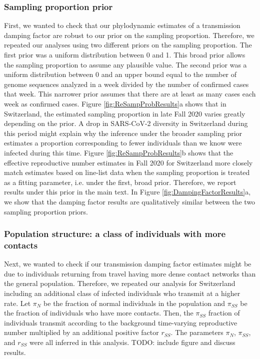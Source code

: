 \documentclass[9pt,twoside,lineno]{pnas-new}
\begin{document}
\subsubsection{Sampling proportion prior}
First, we wanted to check that our phylodynamic estimates of a transmission damping factor are robust to our prior on the sampling proportion. Therefore, we repeated our analyses using two different priors on the sampling proportion. The first prior was a uniform distribution between 0 and 1. This broad prior allows the sampling proportion to assume any plausible value. The second prior was a uniform distribution between 0 and an upper bound equal to the number of genome sequences analyzed in a week divided by the number of confirmed cases that week. This narrower prior assumes that there are at least as many cases each week as confirmed cases. Figure \ref{fig:ReSampProbResults}a shows that in Switzerland, the estimated sampling proportion in late Fall 2020 varies greatly depending on the prior. A drop in SARS-CoV-2 diversity in Switzerland during this period might explain why the inference under the broader sampling prior estimates a proportion corresponding to fewer individuals than we know were infected during this time. Figure \ref{fig:ReSampProbResults}b shows that the effective reproductive number estimates in Fall 2020 for Switzerland more closely match estimates based on line-list data when the sampling proportion is treated as a fitting parameter, i.e. under the first, broad prior. Therefore, we report results under this prior in the main text. In Figure \ref{fig:DampingFactorResults}a, we show that the damping factor results are qualitatively similar between the two sampling proportion priors. 

\subsubsection{Population structure: a class of individuals with more contacts}
Next, we wanted to check if our transmission damping factor estimates might be due to individuals returning from travel having more dense contact networks than the general population. Therefore, we repeated our analysis for Switzerland including an additional class of infected individuals who transmit at a higher rate. Let $\pi_N$ be the fraction of normal individuals in the population and $\pi_{SS}$ be the fraction of individuals who have more contacts. Then, the $\pi_{SS}$ fraction of individuals transmit according to the background time-varying reproductive number multiplied by an additional positive factor $r_{SS}$. The parameters $\pi_N$, $\pi_{SS}$, and $r_{SS}$ were all inferred in this analysis. TODO: include figure and discuss results.
\end{document}
